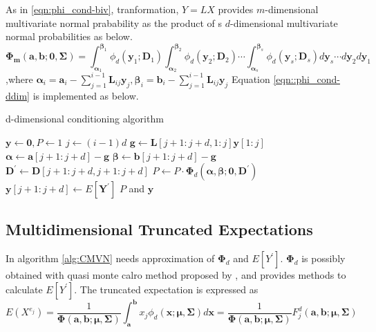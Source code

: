 As in \eqref{eqn:phi_cond-biv}, tranformation, $Y=LX$ provides $m$-dimensional multivariate normal prabability as the product of s $d$-dimensional multivariate normal probabilities as below.
\begin{equation}\label{eqn::phi_cond-ddim}
	\boldsymbol{\Phi_m}(\mathbf{a},\mathbf{b};\mathbf{0},\mathbf{\Sigma})=\int_{\mathbf{\alpha}_1}^{\mathbf{\beta}_1}\phi_d(\mathbf{y}_1;\mathbf{D}_1)\int_{\mathbf{\alpha}_2}^{\mathbf{\beta}_2}\phi_d(\mathbf{y}_2;\mathbf{D}_2)\cdots\int_{\mathbf{\alpha}_s}^{\mathbf{\beta}_s}\phi_d(\mathbf{y}_s;\mathbf{D}_s)d\mathbf{y}_s\cdots d\mathbf{y}_2d\mathbf{y}_1
\end{equation}
,where $\boldsymbol{\alpha}_i=\mathbf{a}_i-\sum_{j=1}^{i-1}\mathbf{L}_{ij}\mathbf{y}_j, \boldsymbol{\beta}_i=\mathbf{b}_i-\sum_{j=1}^{i-1}\mathbf{L}_{ij}\mathbf{y}_j$
Equation \eqref{eqn::phi_cond-ddim} is implemented as below.

\begin{algorithm}[H]
	\caption{d-dimensional conditioning algorithm}
	\begin{algorithmic}[1]
		\State $\mathbf{y}\leftarrow\mathbf{0},P\leftarrow1$
		\State $j\leftarrow(i-1)d$
		\State $\mathbf{g}\leftarrow\mathbf{L}[j+1:j+d,1:j]\mathbf{y}[1:j]$
		\State $\boldsymbol{\alpha}\leftarrow\mathbf{a}[j+1:j+d]-\mathbf{g}$
		\State $\boldsymbol{\beta}\leftarrow\mathbf{b}[j+1:j+d]-\mathbf{g}$
		\State $\mathbf{D}^\prime\leftarrow\mathbf{D}[j+1:j+d,j+1:j+d]$
		\State $P\leftarrow P\cdot\boldsymbol{\Phi}_d(\boldsymbol{\alpha},\boldsymbol{\beta};\mathbf{0},\mathbf{D}^\prime)$
		\State $\mathbf{y}[j+1:j+d]\leftarrow E[\mathbf{Y}^\prime]$
		\EndFor
		\State\Return $P$ and $\mathbf{y}$
		\EndProcedure
	\end{algorithmic}\label{alg:CMVN}
\end{algorithm}

\subsection{Multidimensional Truncated Expectations}
In algorithm \ref{alg:CMVN} needs approximation of $\boldsymbol{\Phi}_d$ and $E[Y^\prime]$. $\boldsymbol{\Phi}_d$ is possibly obtained with quasi monte calro method proposed by \citet{genz2009computation}, and \citet{kan2017moments} provides methods to calculate $E[Y^\prime]$. The truncated expectation is expressed as
$$E(X^{e_j})=\frac{1}{\boldsymbol{\Phi}(\mathbf{a},\mathbf{b};\boldsymbol{\mu},\mathbf{\Sigma})}\int_\mathbf{a}^\mathbf{b}x_j\phi_d(\mathbf{x};\boldsymbol{\mu},\mathbf{\Sigma})d\mathbf{x}=\frac{1}{\boldsymbol{\Phi}(\mathbf{a},\mathbf{b};\boldsymbol{\mu},\mathbf{\Sigma})}F_j^d(\mathbf{a},\mathbf{b};\boldsymbol{\mu},\mathbf{\Sigma})$$


